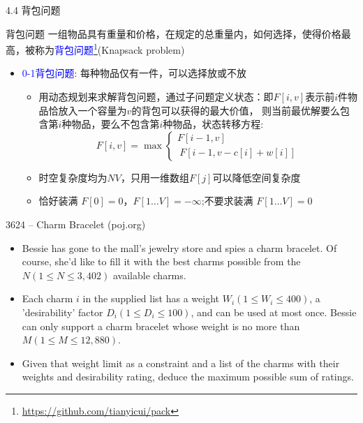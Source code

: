 \begin{frame}{4.4 背包问题}
    \begin{block}{背包问题}
        一组物品具有重量和价格，在规定的总重量内，如何选择，使得价格最高，被称为\textcolor{blue}{背包问题}\footnote{\url{https://github.com/tianyicui/pack}}(Knapsack problem)
    \end{block}
    \begin{itemize}
        \item \textcolor{blue}{0-1背包问题}: 每种物品仅有一件，可以选择放或不放
        \begin{itemize}
            \item 用动态规划来求解背包问题，通过子问题定义状态：即$F[i,v]$表示前$i$件物品恰放入一个容量为$v$的背包可以获得的最大价值，
            则当前最优解要么包含第$i$种物品，要么不包含第$i$种物品，状态转移方程:
            $$F[i,v]=\max\begin{cases} F[i-1,v] \\\ F[i-1,v-c[i]+w[i]] \end{cases} $$
            \item 时空复杂度均为$NV$，只用一维数组$F[j]$可以降低空间复杂度
            \item 恰好装满 $F[0]=0$，$F[1\ldots V]=-\infty$;不要求装满 $F[1\ldots V]=0$
        \end{itemize}
    \end{itemize}
\end{frame}
\begin{frame}{3624 -- Charm Bracelet (poj.org)}
    \begin{itemize}
        \item Bessie has gone to the mall's jewelry store and spies a charm bracelet. Of course, she'd like to fill it with the best charms possible from the $N(1\leq N\leq 3,402)$ available charms.
        \item Each charm $i$ in the supplied list has a weight $W_i(1\leq W_i\leq400)$, a 'desirability' factor $D_i(1\leq D_i\leq 100)$, and can be used at most once. Bessie can only support a charm bracelet whose weight is no more than $M(1\leq M\leq 12,880)$.
        \item Given that weight limit as a constraint and a list of the charms with their weights and desirability rating, deduce the maximum possible sum of ratings.
    \end{itemize}
\end{frame}
